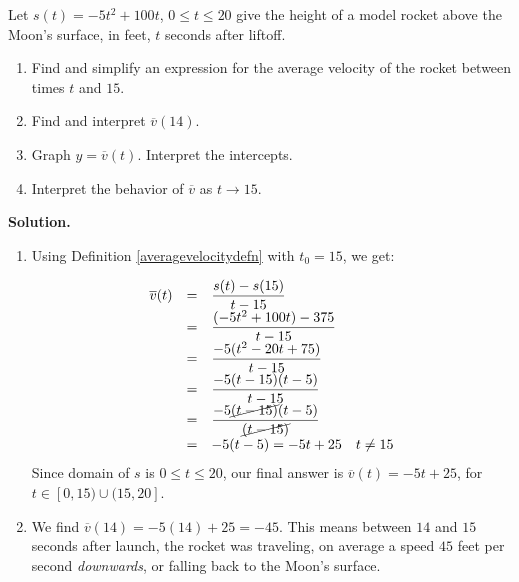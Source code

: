 \begin{ex}
\begin{ex} \label{averagevelocityrocketex} Let $s(t) = -5t^2+100t$, $0 \leq t \leq 20$ give the height of a model rocket above the Moon's surface, in feet,  $t$ seconds after liftoff.  

\begin{enumerate}

\item  Find and simplify an expression for the average velocity of the rocket between times $t$ and $15$.

\item Find and interpret $\overline{v}(14)$.

\item  Graph $y = \overline{v}(t)$. Interpret the intercepts.

\item Interpret the behavior of $\overline{v}$ as $t \rightarrow 15$.

\end{enumerate}

{\bf Solution.}

\begin{enumerate}

\item Using Definition \ref{averagevelocitydefn} with $t_{0} = 15$, we get: 

\[ \begin{array}{rclr}

 \overline{v}(t) & = & \dfrac{s(t) - s(15)}{t-15} \\
                       & =  & \dfrac{(-5t^2+100t) - 375}{t - 15}  \\
                        & =  & \dfrac{-5(t^2-20t+75)}{t - 15}  \\
                        & = & \dfrac{-5(t-15)(t-5)}{t-15}  \\
                        & = &  \dfrac{-5\cancel{(t-15)} (t-5)}{\cancel{(t-15)}} \\
                         & = & -5(t-5) = -5t + 25 & \text{$t \neq 15$} \end{array} \]
Since  domain of $s$ is  $0 \leq t \leq 20$, our final answer is $\overline{v}(t) = -5t+25$,  for $t \in [0, 15) \cup (15, 20]$. 

\item  We find $\overline{v}(14) = -5(14)+25 = -45$.  This means between  $14$ and $15$ seconds after launch, the rocket was traveling, on average  a speed $45$ feet per second \textit{downwards}, or falling back to the Moon's surface.


\end{enumerate}
\end{ex}
\end{ex}

